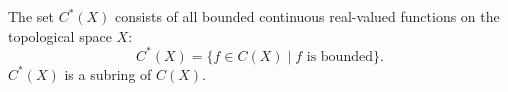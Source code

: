 The set $C^*(X)$ consists of all bounded continuous real-valued functions on the topological space $X$:
$$C^*(X) = \{f \in C(X) \mid f \text{ is bounded}\}.$$
$C^*(X)$ is a subring of $C(X)$.
